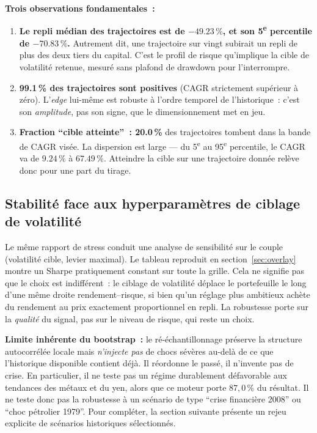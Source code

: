 \begin{insightbox}
\textbf{Trois observations fondamentales~:}
\begin{enumerate}
\item \textbf{Le repli médian des trajectoires est de $-49.23\,\%$, et son 5\textsuperscript{e} percentile de $-70.83\,\%$.} Autrement dit, une trajectoire sur vingt subirait un repli de plus des deux tiers du capital. C'est le profil de risque qu'implique la cible de volatilité retenue, mesuré sans plafond de drawdown pour l'interrompre.
\item \textbf{99.1\,\% des trajectoires sont positives} (CAGR strictement supérieur à zéro). L'\emph{edge} lui-même est robuste à l'ordre temporel de l'historique~: c'est son \emph{amplitude}, pas son signe, que le dimensionnement met en jeu.
\item \textbf{Fraction \enquote{cible atteinte}~: 20.0\,\%} des trajectoires tombent dans la bande de CAGR visée. La dispersion est large --- du 5\textsuperscript{e} au 95\textsuperscript{e} percentile, le CAGR va de $9.24\,\%$ à $67.49\,\%$. Atteindre la cible sur une trajectoire donnée relève donc pour une part du tirage.
\end{enumerate}
\end{insightbox}

\subsection{Stabilité face aux hyperparamètres de ciblage de volatilité}

Le même rapport de stress conduit une analyse de sensibilité sur le couple (volatilité cible, levier maximal). Le tableau reproduit en section~\ref{sec:overlay} montre un Sharpe pratiquement constant sur toute la grille. Cela ne signifie pas que le choix est indifférent~: le ciblage de volatilité déplace le portefeuille le long d'une même droite rendement--risque, si bien qu'un réglage plus ambitieux achète du rendement au prix exactement proportionnel en repli. La robustesse porte sur la \emph{qualité} du signal, pas sur le niveau de risque, qui reste un choix.

\begin{warningbox}
\textbf{Limite inhérente du bootstrap~:} le ré-échantillonnage préserve la structure autocorrélée locale mais \emph{n'injecte pas} de chocs sévères au-delà de ce que l'historique disponible contient déjà. Il réordonne le passé, il n'invente pas de crise. En particulier, il ne teste pas un régime durablement défavorable aux tendances des métaux et du yen, alors que ce moteur porte $87{,}0\,\%$ du résultat. Il ne teste donc pas la robustesse à un scénario de type \enquote{crise financière 2008} ou \enquote{choc pétrolier 1979}. Pour compléter, la section suivante présente un rejeu explicite de scénarios historiques sélectionnés.
\end{warningbox}
